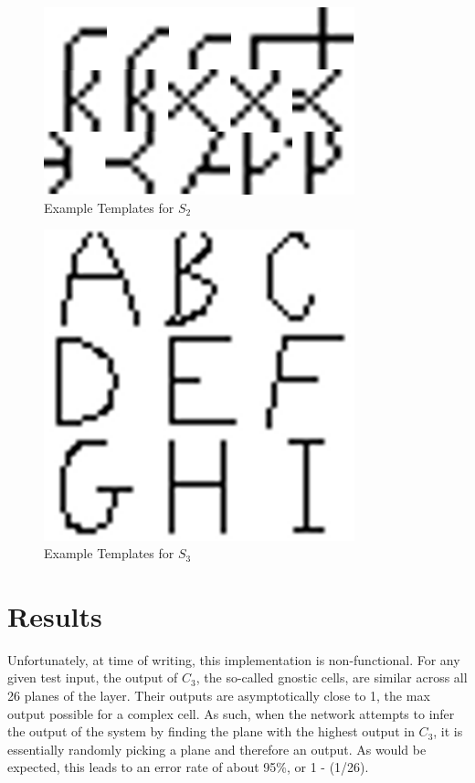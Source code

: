 \documentclass[12pt]{article}
\begin{document}
\begin{figure}[ht!]
\centering
\includegraphics[width=90mm]{secondLayer.png}
\caption{Example Templates for $S_2$}
\end{figure}

\begin{figure}[ht!]
\centering
\includegraphics[width=90mm]{thirdLayer.png}
\caption{Example Templates for $S_3$}
\end{figure}

\section{Results}
Unfortunately, at time of writing, this implementation is non-functional. For any given test input, the output of $C_3$, the so-called gnostic cells, are similar across all 26 planes of the layer. Their outputs are asymptotically close to 1, the max output possible for a complex cell. As such, when the network attempts to infer the output of the system by finding the plane with the highest output in $C_3$, it is essentially randomly picking a plane and therefore an output. As would be expected, this leads to an error rate of about 95\%, or 1 - (1/26). 
\end{document}
